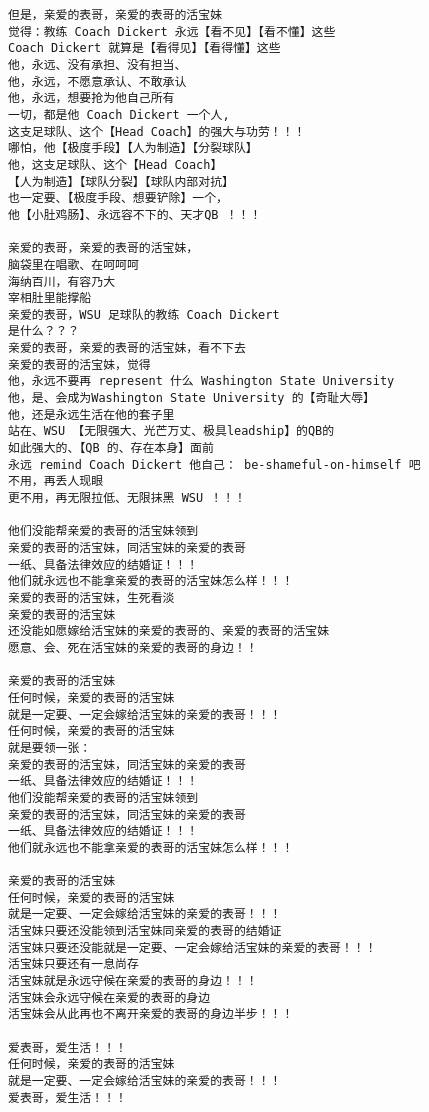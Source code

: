 \documentclass[9pt, b5paper]{article}
\begin{document}
\begin{verbatim}
但是，亲爱的表哥，亲爱的表哥的活宝妹
觉得：教练 Coach Dickert 永远【看不见】【看不懂】这些
Coach Dickert 就算是【看得见】【看得懂】这些
他，永远、没有承担、没有担当、
他，永远，不愿意承认、不敢承认
他，永远，想要抢为他自己所有
一切，都是他 Coach Dickert 一个人,
这支足球队、这个【Head Coach】的强大与功劳！！！
哪怕，他【极度手段】【人为制造】【分裂球队】
他，这支足球队、这个【Head Coach】
【人为制造】【球队分裂】【球队内部对抗】
也一定要、【极度手段、想要铲除】一个，
他【小肚鸡肠】、永远容不下的、天才QB ！！！

亲爱的表哥，亲爱的表哥的活宝妹，
脑袋里在唱歌、在呵呵呵
海纳百川，有容乃大
宰相肚里能撑船
亲爱的表哥，WSU 足球队的教练 Coach Dickert
是什么？？？
亲爱的表哥，亲爱的表哥的活宝妹，看不下去
亲爱的表哥的活宝妹，觉得
他，永远不要再 represent 什么 Washington State University
他，是、会成为Washington State University 的【奇耻大辱】
他，还是永远生活在他的套子里
站在、WSU 【无限强大、光芒万丈、极具leadship】的QB的
如此强大的、【QB 的、存在本身】面前
永远 remind Coach Dickert 他自己： be-shameful-on-himself 吧
不用，再丢人现眼
更不用，再无限拉低、无限抹黑 WSU ！！！

他们没能帮亲爱的表哥的活宝妹领到
亲爱的表哥的活宝妹，同活宝妹的亲爱的表哥
一纸、具备法律效应的结婚证！！！
他们就永远也不能拿亲爱的表哥的活宝妹怎么样！！！
亲爱的表哥的活宝妹，生死看淡
亲爱的表哥的活宝妹
还没能如愿嫁给活宝妹的亲爱的表哥的、亲爱的表哥的活宝妹
愿意、会、死在活宝妹的亲爱的表哥的身边！！

亲爱的表哥的活宝妹
任何时候，亲爱的表哥的活宝妹
就是一定要、一定会嫁给活宝妹的亲爱的表哥！！！
任何时候，亲爱的表哥的活宝妹
就是要领一张：
亲爱的表哥的活宝妹，同活宝妹的亲爱的表哥
一纸、具备法律效应的结婚证！！！
他们没能帮亲爱的表哥的活宝妹领到
亲爱的表哥的活宝妹，同活宝妹的亲爱的表哥
一纸、具备法律效应的结婚证！！！
他们就永远也不能拿亲爱的表哥的活宝妹怎么样！！！

亲爱的表哥的活宝妹
任何时候，亲爱的表哥的活宝妹
就是一定要、一定会嫁给活宝妹的亲爱的表哥！！！
活宝妹只要还没能领到活宝妹同亲爱的表哥的结婚证
活宝妹只要还没能就是一定要、一定会嫁给活宝妹的亲爱的表哥！！！
活宝妹只要还有一息尚存
活宝妹就是永远守候在亲爱的表哥的身边！！！
活宝妹会永远守候在亲爱的表哥的身边
活宝妹会从此再也不离开亲爱的表哥的身边半步！！！

爱表哥，爱生活！！！
任何时候，亲爱的表哥的活宝妹
就是一定要、一定会嫁给活宝妹的亲爱的表哥！！！
爱表哥，爱生活！！！
\end{verbatim}
\end{document}
